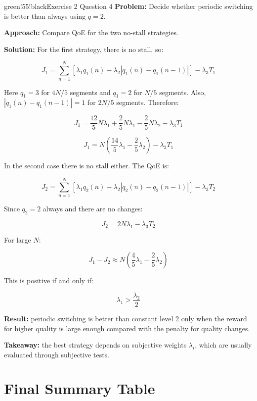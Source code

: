 \begin{calloutbox}{green!55!black}{Exercise 2 Question 4}
\textbf{Problem:} Decide whether periodic switching is better than always using $q=2$.

\textbf{Approach:} Compare QoE for the two no-stall strategies.

\textbf{Solution:} For the first strategy, there is no stall, so:

\[
J_1 =
\sum_{n=1}^{N}
[\lambda_1 q_1(n) - \lambda_2 |q_1(n)-q_1(n-1)|]
- \lambda_3 T_1
\]

Here $q_1=3$ for $4N/5$ segments and $q_1=2$ for $N/5$ segments. Also, $|q_1(n)-q_1(n-1)|=1$ for $2N/5$ segments. Therefore:

\[
J_1 =
\frac{12}{5}N\lambda_1
+ \frac{2}{5}N\lambda_1
- \frac{2}{5}N\lambda_2
- \lambda_3 T_1
\]

\[
J_1 =
N\left(\frac{14}{5}\lambda_1 - \frac{2}{5}\lambda_2\right)
- \lambda_3 T_1
\]

In the second case there is no stall either. The QoE is:

\[
J_2 =
\sum_{n=1}^{N}
[\lambda_1 q_2(n) - \lambda_2 |q_2(n)-q_2(n-1)|]
- \lambda_3 T_2
\]

Since $q_2=2$ always and there are no changes:

\[
J_2 = 2N\lambda_1 - \lambda_3 T_2
\]

For large $N$:

\[
J_1 - J_2
\approx
N\left(\frac{4}{5}\lambda_1 - \frac{2}{5}\lambda_2\right)
\]

This is positive if and only if:

\[
\lambda_1 > \frac{\lambda_2}{2}
\]

\textbf{Result:} periodic switching is better than constant level 2 only when the reward for higher quality is large enough compared with the penalty for quality changes.

\textbf{Takeaway:} the best strategy depends on subjective weights $\lambda_i$, which are usually evaluated through subjective tests.
\end{calloutbox}

\section{Final Summary Table}

